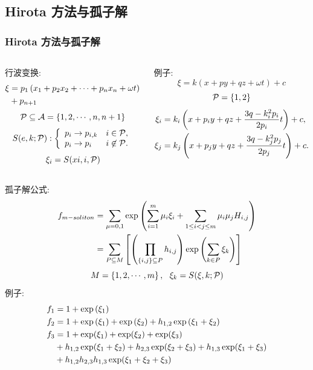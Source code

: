 \subsection{Hirota 方法与孤子解}
\begin{frame}
\frametitle{Hirota 方法与孤子解}
\begin{columns}
\small 
\begin{column}{0.5\textwidth}
行波变换:
\[
\begin{split}
    \xi&=p_1\left(x_1+p_2x_2+\cdots+p_nx_n+\omega t\right) \\ 
    &+p_{n+1}
\end{split}
\]
\[
    \mathcal{P}\subseteq  \mathcal{A}=\left\{1,2,\cdots,n,n+1\right\}
\]
\[
    S(e,k;\mathcal{P}): \left\{\begin{array}{ll}
        p_i \rightarrow p_{i,k} & i \in \mathcal{P}, \\ 
        p_i \rightarrow p_i & i \not\in \mathcal{P}.
    \end{array}\right.
\]
\[
    \xi_i=S(xi,i,\mathcal{P})
\]
\end{column}
\begin{column}{0.5\textwidth}
例子:
\[
    \xi=k(x+py+qz+\omega t)+c
\]
\[
    \mathcal{P}=\left\{1,2\right\}
\]
\[
\begin{split}
    \xi_i&=k_i\left(x+p_iy+qz+\frac{3q-k_i^2p_i}{2p_i}t\right)+c, \\ 
    \xi_j&=k_j\left(x+p_jy+qz+\frac{3q-k_j^2p_j}{2p_j}t\right)+c.
\end{split} 
\]
\end{column}
\end{columns}
\end{frame}

\begin{frame}
孤子解公式:
\[
\begin{split}
    f_{m-soliton}&=\sum_{\mu=0,1}\exp\left(\sum_{i=1}^m{\mu_i \xi_i}+\sum_{1\le i<j\le m}{\mu_i\mu_jH_{i,j}}\right) \\ 
    &=\sum_{P\subseteq M}\left[\left(\prod_{\left\{i,j\right\}\subseteq P}{h_{i,j}}\right)\exp\left(\sum_{k\in P}{\xi_k}\right)\right] \\ 
\end{split}
\]
\[
    M=\left\{1,2,\cdots,m\right\},~~\xi_k=S(\xi,k;\mathcal{P})
\]
例子:
\[
\begin{split}
    f_1&=1+\exp\left(\xi_1\right) \\ 
    f_2&=1+\exp\left(\xi_1\right)+\exp\left(\xi_2\right)+h_{1,2}\exp\left(\xi_1+\xi_2\right) \\ 
    f_3&=1+\exp(\xi_1)+\exp(\xi_2)+\exp(\xi_3)\\
       &+h_{1,2}\exp(\xi_1+\xi_2)+h_{2,3}\exp(\xi_2+\xi_3)+h_{1,3}\exp(\xi_1+\xi_3)\\
       &+h_{1,2}h_{2,3}h_{1,3}\exp(\xi_1+\xi_2+\xi_3)
\end{split}
\]
\end{frame}

